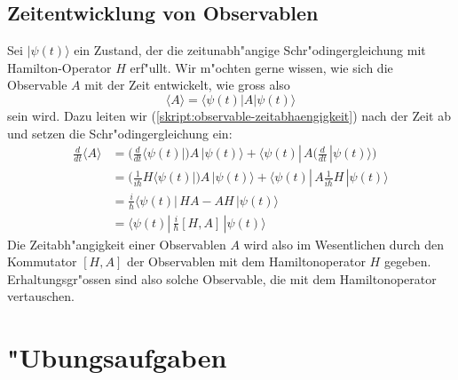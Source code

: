 %
%
\subsection{Zeitentwicklung von Observablen}
Sei $|\psi(t)\rangle$ ein Zustand, der die zeitunabh"angige
Schr"odingergleichung mit Hamilton-Operator $H$ erf"ullt. Wir m"ochten
gerne wissen, wie sich die Observable $A$ mit der Zeit entwickelt,
wie gross also
\begin{equation}
\langle A\rangle
=
\langle \psi(t)|A|\psi(t)\rangle
\label{skript:observable-zeitabhaengigkeit}
\end{equation}
sein wird. Dazu leiten wir (\ref{skript:observable-zeitabhaengigkeit}) nach der
Zeit ab und setzen die Schr"odingergleichung ein:
\begin{align*}
\frac{d}{dt}\langle A\rangle
&=
\biggl(\frac{d}{dt}\langle\psi(t)|\biggr)A\,|\psi(t)\rangle
+
\langle\psi(t)|\,A\biggl(\frac{d}{dt}\,|\psi(t)\rangle\biggr)
\\
&=
\biggl(\frac{1}{i\hbar}H\langle\psi(t)|\biggr)A\,|\psi(t)\rangle
+
\langle\psi(t)|\,A\frac{1}{i\hbar}H\,|\psi(t)\rangle
\\
&=
\frac{i}{\hbar}
\langle\psi(t)|\, HA-AH \,|\psi(t)\rangle
\\
&=\langle\psi(t)|\, \frac{i}{\hbar}[H,A] \,|\psi(t)\rangle
\end{align*}
Die Zeitabh"angigkeit einer Observablen $A$ wird also im Wesentlichen
durch den Kommutator $[H,A]$ der Observablen mit dem Hamiltonoperator $H$
gegeben. Erhaltungsgr"ossen sind also solche Observable, die mit dem
Hamiltonoperator vertauschen.

\section*{"Ubungsaufgaben}
\begin{uebungsaufgaben}
\item

\item

\item

\item

\end{uebungsaufgaben}

